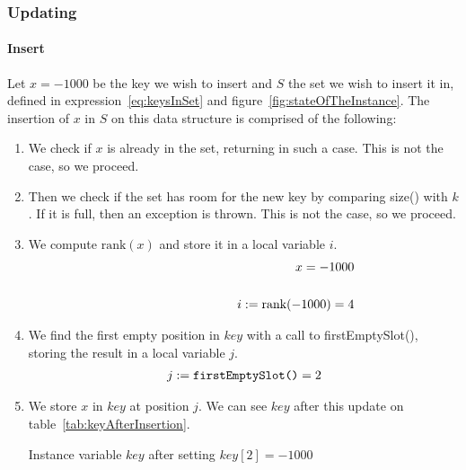 \subsubsection{Updating}

\paragraph{Insert} \label{sec:binaryRankInsertExample}

Let $x = -1000$ be the key we wish to insert and $S$ the set we wish to insert it in, defined in expression~\ref{eq:keysInSet} and figure~\ref{fig:stateOfTheInstance}. The insertion of $x$ in $S$ on this data structure is comprised of the following:
\begin{enumerate}
    \item
    We check if $x$ is already in the set, returning in such a case.
    This is not the case, so we proceed.
    
    \item
    Then we check if the set has room for the new key by comparing {\ttfamily size()} with $k$. If it is full, then an exception is thrown.
    This is not the case, so we proceed.
    
    \item
    We compute $\text{rank}(x)$ and store it in a local variable $i$.
    \begin{align*}
        x = -1000 \\
        \cline{1-2}
        i := \text{rank}(-1000) = 4
    \end{align*}
    
    \item
    We find the first empty position in $key$ with a call to {\ttfamily firstEmptySlot()}, storing the result in a local variable $j$.
    \begin{align*}
        j := \text{{\ttfamily firstEmptySlot()}} = 2
    \end{align*}
    
    \item
    We store $x$ in $key$ at position $j$. We can see $key$ after this update on table~\ref{tab:keyAfterInsertion}.
    \begin{table}[H]
    \centering
    
    \caption[Example $key$ after the insertion of a new key]{Instance variable $key$ after setting $key[2] = -1000$}
    \label{tab:keyAfterInsertion}
    \end{table}
    

\end{enumerate}
